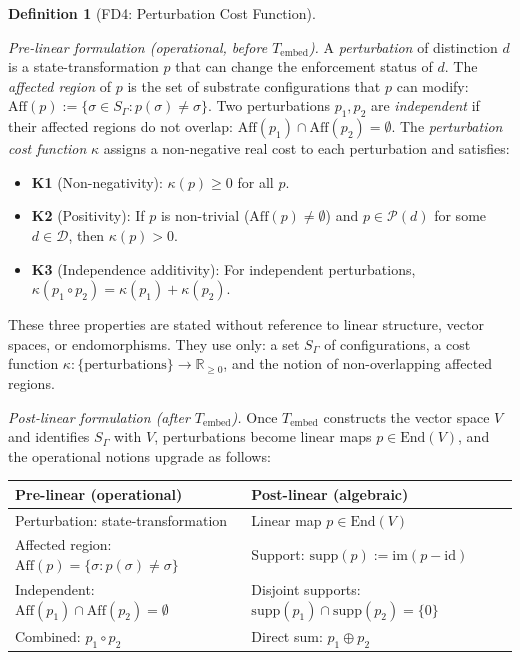 \documentclass[11pt,a4paper]{article}
\theoremstyle{definition}
\newtheorem{definition}[theorem]{Definition}
\newcommand{\End}{\mathrm{End}}
\newcommand{\im}{\mathrm{im}}
\begin{document}
\begin{definition}[FD4: Perturbation Cost Function]\label{def:FD4}

\textit{Pre-linear formulation (operational, before $T_{\mathrm{embed}}$).}  A \emph{perturbation} of distinction $d$ is a state-transformation $p$ that can change the enforcement status of $d$.  The \emph{affected region} of $p$ is the set of substrate configurations that $p$ can modify: $\mathrm{Aff}(p) := \{\sigma \in S_\Gamma : p(\sigma) \ne \sigma\}$.  Two perturbations $p_1, p_2$ are \emph{independent} if their affected regions do not overlap: $\mathrm{Aff}(p_1) \cap \mathrm{Aff}(p_2) = \emptyset$.  The \emph{perturbation cost function} $\kappa$ assigns a non-negative real cost to each perturbation and satisfies:

\begin{itemize}[nosep,leftmargin=2em,itemsep=2pt]
\item \textbf{K1} (Non-negativity): $\kappa(p) \ge 0$ for all $p$.
\item \textbf{K2} (Positivity): If $p$ is non-trivial ($\mathrm{Aff}(p) \ne \emptyset$) and $p \in \mathcal{P}(d)$ for some $d \in \mathcal{D}$, then $\kappa(p) > 0$.
\item \textbf{K3} (Independence additivity): For independent perturbations, $\kappa(p_1 \circ p_2) = \kappa(p_1) + \kappa(p_2)$.
\end{itemize}

These three properties are stated without reference to linear structure, vector spaces, or endomorphisms.  They use only: a set $S_\Gamma$ of configurations, a cost function $\kappa: \{\text{perturbations}\} \to \mathbb{R}_{\ge 0}$, and the notion of non-overlapping affected regions.

\smallskip\noindent
\textit{Post-linear formulation (after $T_{\mathrm{embed}}$).}  Once $T_{\mathrm{embed}}$ constructs the vector space $V$ and identifies $S_\Gamma$ with $V$, perturbations become linear maps $p \in \End(V)$, and the operational notions upgrade as follows:

\smallskip
\begin{center}\small
\begin{tabular}{@{}ll@{}}
\toprule
\textbf{Pre-linear (operational)} & \textbf{Post-linear (algebraic)} \\
\midrule
Perturbation: state-transformation & Linear map $p \in \End(V)$ \\
Affected region: $\mathrm{Aff}(p) = \{\sigma : p(\sigma) \ne \sigma\}$ & Support: $\mathrm{supp}(p) := \im(p - \mathrm{id})$ \\
Independent: $\mathrm{Aff}(p_1) \cap \mathrm{Aff}(p_2) = \emptyset$ & Disjoint supports: $\mathrm{supp}(p_1) \cap \mathrm{supp}(p_2) = \{0\}$ \\
Combined: $p_1 \circ p_2$ & Direct sum: $p_1 \oplus p_2$ \\
\bottomrule
\end{tabular}
\end{center}


\end{definition}
\end{document}
